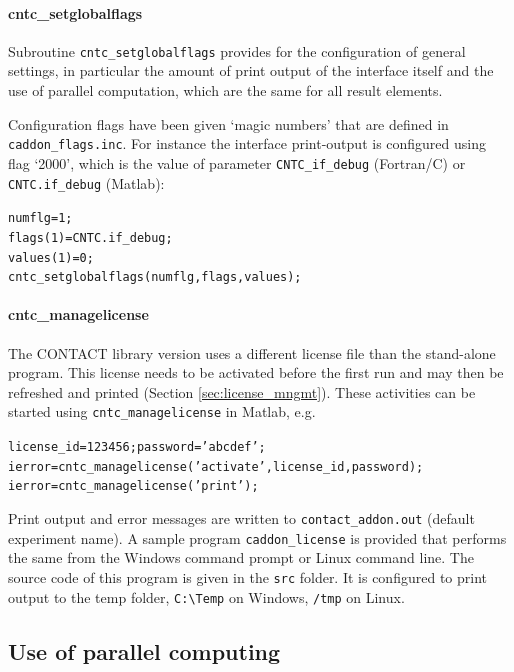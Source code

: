 \documentclass[12pt]{report}
\begin{document}
\paragraph{cntc\_setglobalflags}

Subroutine {\tt cntc\_setglobalflags} provides for the configuration of
general settings, in particular the amount of print output of the
interface itself and the use of parallel computation, which are the same
for all result elements.

Configuration flags have been given `magic numbers' that are defined in {\tt 
caddon\_flags.inc}. For instance the interface
print-output is configured using flag `2000', which is the value of
parameter {\tt CNTC\_if\_debug} (Fortran/C) or {\tt CNTC.if\_debug} (Matlab):
\begin{alltt}\small
    numflg    = 1;             %
    flags(1)  = CNTC.if_debug;
    values(1) = 0;
    cntc_setglobalflags(numflg, flags, values);
\end{alltt}

\paragraph{cntc\_managelicense}

The CONTACT library version uses a different license file than the
stand-alone program. This license needs to be activated before the first
run and may then be refreshed and printed (Section \ref{sec:license_mngmt}).
These activities can be started using {\tt cntc\_manage\-li\-cense} in Matlab,
e.g.\
\begin{alltt}\small
    license_id = 123456; password = 'abcdef';
    ierror = cntc_managelicense('activate', license_id, password);
    ierror = cntc_managelicense('print');
\end{alltt}
Print output and error messages are written to {\tt contact\_addon.out}
(default experiment name). A sample program {\tt caddon\_license} is
provided that performs the same from the Windows command prompt or Linux
command line. The source code of this program is given in the {\tt src}
folder. It is configured to print output to the temp folder, \verb+C:\Temp+
on Windows, \verb+/tmp+ on Linux.

\subsection{Use of parallel computing}
\end{document}
